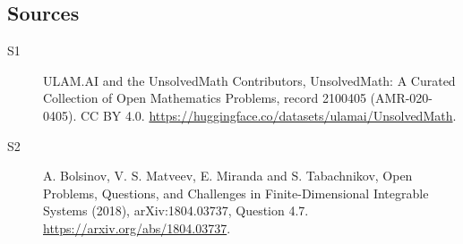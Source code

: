\documentclass[11pt]{article}
\begin{document}
\subsection{Sources}
\begin{description}
\item[\hypertarget{source:2100405:1}{S1}] ULAM.AI and the UnsolvedMath Contributors, UnsolvedMath: A Curated Collection of Open Mathematics Problems, record 2100405 (AMR-020-0405). CC BY 4.0. \url{https://huggingface.co/datasets/ulamai/UnsolvedMath}.
\item[\hypertarget{source:2100405:2}{S2}] A. Bolsinov, V. S. Matveev, E. Miranda and S. Tabachnikov, Open Problems, Questions, and Challenges in Finite-Dimensional Integrable Systems (2018), arXiv:1804.03737, Question 4.7. \url{https://arxiv.org/abs/1804.03737}.
\end{description}
\label{end:2100405}
\end{document}

